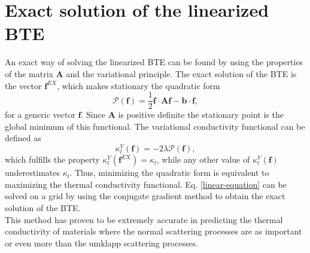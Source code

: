\section{Exact solution of the linearized BTE}

An exact way of solving the linearized BTE can be found by using the properties of the matrix $\mathbf{A}$ and the variational principle. The exact solution of the BTE is the vector $\mathbf{f}^{EX}$, which makes stationary 
the quadratic form\cite{klemens1958thermal}
\begin{equation}
 \mathcal{P}(\mathbf{f})=\frac{1}{2}\mathbf{f}\cdot\mathbf{A}\mathbf{f}-\mathbf{b}\cdot\mathbf{f},
\end{equation}
for a generic vector $\mathbf{f}$. Since $\mathbf{A}$ is positive definite the stationary point is the global minimum of this functional. The variational conductivity functional can be defined as
\begin{equation}
 \kappa_{l}^{V}(\mathbf{f})=-2\lambda\mathcal{P}(\mathbf{f}),
\end{equation}
which fulfills the property $\kappa_{l}^{V}(\mathbf{f}^{EX})=\kappa_{l}$, while any other value of $\kappa_{l}^{V}(\mathbf{f})$ underestimates $\kappa_{l}$. Thus, minimizing the quadratic form is equivalent to 
maximizing the thermal conductivity functional. Eq. \ref{linear-equation} can be solved on a grid\cite{fugallo2013ab} by using the conjugate gradient method to obtain the exact solution of the BTE. \\

This method has proven to be extremely accurate in predicting the thermal conductivity of materials where the normal scattering processes are as important or even more than the umklapp scattering 
processes\cite{fugallo2014thermal,cepellotti2015phonon}. 
